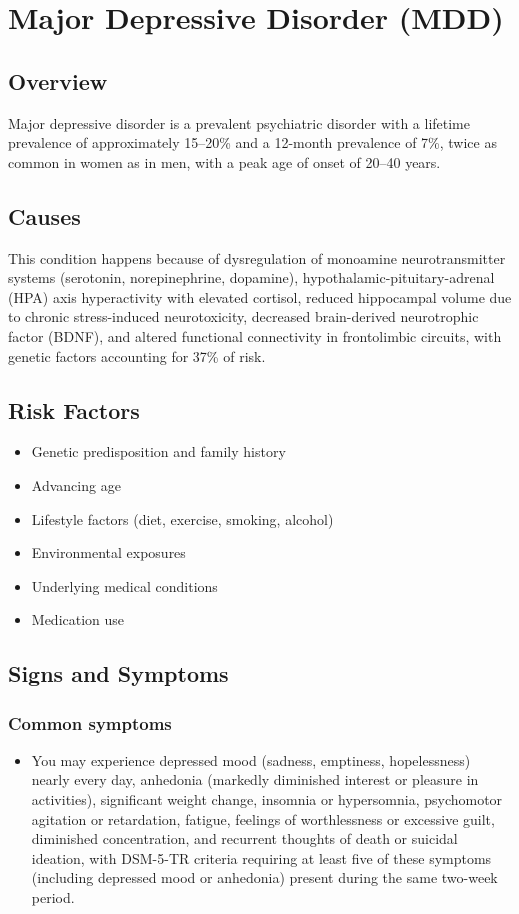 \chapter{Major Depressive Disorder (MDD)}
\label{sec:Major Depressive Disorder (MDD)}

\section{Overview}
Major depressive disorder is a prevalent psychiatric disorder with a lifetime prevalence of approximately 15--20\% and a 12-month prevalence of 7\%, twice as common in women as in men, with a peak age of onset of 20--40 years.
\section{Causes}
This condition happens because of dysregulation of monoamine neurotransmitter systems (serotonin, norepinephrine, dopamine), hypothalamic-pituitary-adrenal (HPA) axis hyperactivity with elevated cortisol, reduced hippocampal volume due to chronic stress-induced neurotoxicity, decreased brain-derived neurotrophic factor (BDNF), and altered functional connectivity in frontolimbic circuits, with genetic factors accounting for 37\% of risk.     
\section{Risk Factors}

\begin{itemize}[noitemsep]
  \item Genetic predisposition and family history
  \item Advancing age
  \item Lifestyle factors (diet, exercise, smoking, alcohol)
  \item Environmental exposures
  \item Underlying medical conditions
  \item Medication use
\end{itemize}
\section{Signs and Symptoms}

\subsection{Common symptoms}
\begin{itemize}[noitemsep]
  \item You may experience depressed mood (sadness, emptiness, hopelessness) nearly every day, anhedonia (markedly diminished interest or pleasure in activities), significant weight change, insomnia or hypersomnia, psychomotor agitation or retardation, fatigue, feelings of worthlessness or excessive guilt, diminished concentration, and recurrent thoughts of death or suicidal ideation, with DSM-5-TR criteria requiring at least five of these symptoms (including depressed mood or anhedonia) present during the same two-week period. 
  \end{itemize}

